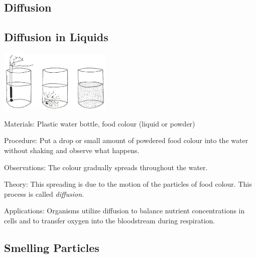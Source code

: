 \begin{multicols}{2}
\columnbreak


\section*{Diffusion} 

\subsection{Diffusion in Liquids}

\begin{center}
\includegraphics[width=0.4\textwidth]{./img/vso/diffusion.jpg}
\end{center}

\begin{description*}
\item[Materials:]{Plastic water bottle, food colour (liquid or powder)}
\item[Procedure:]{Put a drop or small amount of powdered food colour into the water without shaking and observe what happens.}
\item[Observations:]{The colour gradually spreads throughout the water.}
\item[Theory:]{This spreading is due to the motion of the particles of food colour. This process is called \emph{diffusion}.}
\item[Applications:]{Organisms utilize diffusion to balance nutrient concentrations in cells and to transfer oxygen into the bloodstream during respiration.}
\end{description*}

\subsection{Smelling Particles}


\end{multicols}

